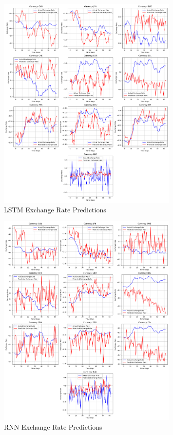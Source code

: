 \documentclass[a4paper,10pt]{article}
\begin{document}
\begin{figure}[ht]
    \centering
    \includegraphics[width=0.8\textwidth]{fig/lstm_exchange_rate_predictions.png}
    \caption{LSTM Exchange Rate Predictions}
    \label{fig:lstm_predictions}
\end{figure}

\begin{figure}[ht]
    \centering
    \includegraphics[width=0.8\textwidth]{fig/rnn_exchange_rate_predictions.png}
    \caption{RNN Exchange Rate Predictions}
    \label{fig:rnn_predictions}
\end{figure}
\end{document}

